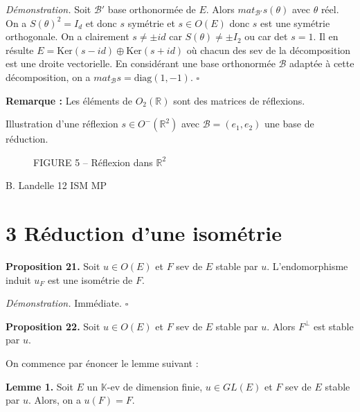\textit{Démonstration.} Soit $\mathcal{B}'$ base orthonormée de $E$. Alors $mat_{\mathcal{B}'} s( \theta)$ avec $\theta$ réel. On a $S(\theta)^2 = I_d$ et donc $s$ symétrie et $s \in O(E)$ donc $s$ est une symétrie orthogonale. On a clairement
$s \neq \pm id$ car $S(\theta) \neq \pm I_2$ ou car det $s = 1$. Il en résulte $E = \text{Ker}(s - id) \oplus \text{Ker}(s + id)$
où chacun des sev de la décomposition est une droite vectorielle. En considérant une base
orthonormée $\mathcal{B}$ adaptée à cette décomposition, on a $mat_{\mathcal{B}} s = \text{diag}(1, -1)$.
$\square$

\textbf{Remarque :} Les éléments de $O_2(\mathbb{R})$ sont des matrices de réflexions.

Illustration d'une réflexion $s \in O^-(\mathbb{R}^2)$ avec
$\mathcal{B} = (e_1, e_2)$ une base de réduction.

\begin{figure}[H]
\centering
{}
\caption{FIGURE 5 – Réflexion dans $\mathbb{R}^2$}
\end{figure}

B. Landelle \hspace{2cm} 12 \hspace{5cm} ISM MP

\section{3 Réduction d'une isométrie}

\textbf{Proposition 21.} Soit $u \in O(E)$ et $F$ sev de $E$ stable par $u$. L'endomorphisme induit $u_F$ est une isométrie de $F$.

\textit{Démonstration.} Immédiate. \hfill $\square$

\textbf{Proposition 22.} Soit $u \in O(E)$ et $F$ sev de $E$ stable par $u$. Alors $F^\perp$ est stable par $u$.

On commence par énoncer le lemme suivant :

\textbf{Lemme 1.} Soit $E$ un $\mathbb{K}$-ev de dimension finie, $u \in GL(E)$ et $F$ sev de $E$ stable par $u$. Alors, on a $u(F) = F$.

